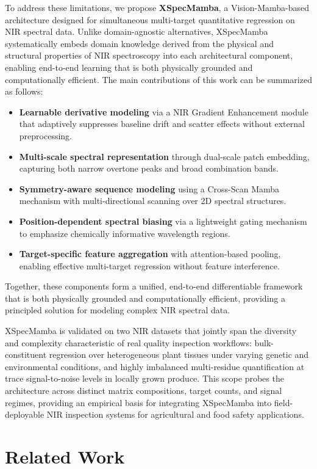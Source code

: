 \documentclass[pdflatex,sn-mathphys-num]{sn-jnl}%
\begin{document}
To address these limitations, we propose \textbf{XSpecMamba}, a Vision-Mamba-based architecture designed for simultaneous multi-target quantitative regression on NIR spectral data. Unlike domain-agnostic alternatives, XSpecMamba systematically embeds domain knowledge derived from the physical and structural properties of NIR spectroscopy into each architectural component, enabling end-to-end learning that is both physically grounded and computationally efficient. The main contributions of this work can be summarized as follows:
\begin{itemize}
    \item \textbf{Learnable derivative modeling} via a NIR Gradient Enhancement module that adaptively suppresses baseline drift and scatter effects without external preprocessing.
    \item \textbf{Multi-scale spectral representation} through dual-scale patch embedding, capturing both narrow overtone peaks and broad combination bands.
    \item \textbf{Symmetry-aware sequence modeling} using a Cross-Scan Mamba mechanism with multi-directional scanning over 2D spectral structures.
    \item \textbf{Position-dependent spectral biasing} via a lightweight gating mechanism to emphasize chemically informative wavelength regions.
    \item \textbf{Target-specific feature aggregation} with attention-based pooling, enabling effective multi-target regression without feature interference.    
\end{itemize}

Together, these components form a unified, end-to-end differentiable framework that is both physically grounded and computationally efficient, providing a principled solution for modeling complex NIR spectral data.

XSpecMamba is validated on two NIR datasets that jointly span the diversity and complexity characteristic of real quality inspection workflows: bulk-constituent regression over heterogeneous plant tissues under varying genetic and environmental conditions, and highly imbalanced multi-residue quantification at trace signal-to-noise levels in locally grown produce. This scope probes the architecture across distinct matrix compositions, target counts, and signal regimes, providing an empirical basis for integrating XSpecMamba into field-deployable NIR inspection systems for agricultural and food safety applications.

\section{Related Work}
\end{document}
